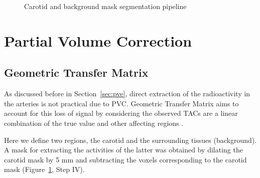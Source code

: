 \begin{figure}[h]
	\centering
	\caption{Carotid and background mask segmentation pipeline}
	\label{fig:seg_pipeline}
\end{figure}

\section{Partial Volume Correction}

\subsection{Geometric Transfer Matrix}
As discussed before in Section~\ref{sec:pve}, direct extraction of the radioactivity in the arteries is not practical due to PVC.
Geometric Transfer Matrix aims to account for this loss of signal by considering the observed TACs are a linear combination of the true value and other affecting regions \cite{rousset1998correction}.

Here we define two regions, the carotid and the surrounding tissues (background).
A mask for extracting the activities of the latter was obtained by dilating the carotid mask by 5 mm and subtracting the voxels corresponding to the carotid mask (Figure~\ref{fig:seg_pipeline}, Step IV).

